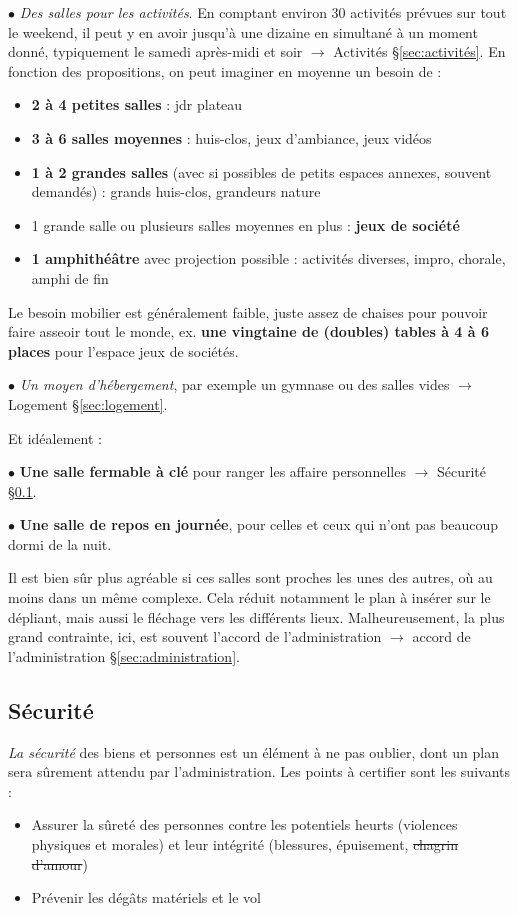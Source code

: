 $\bullet$ \emph{Des salles pour les activités}. En comptant environ 30 activités prévues sur tout le weekend, il peut y en avoir jusqu'à une dizaine en simultané à un moment donné, typiquement le samedi après-midi et soir $\to$ Activités \S\ref{sec:activités}. En fonction des propositions, on peut imaginer en moyenne un besoin de :
\begin{itemize}
    \item \textbf{2 à 4 petites salles} : jdr plateau
    \item \textbf{3 à 6 salles moyennes} : huis-clos, jeux d'ambiance, jeux vidéos
    \item \textbf{1 à 2 grandes salles} (avec si possibles de petits espaces annexes, souvent demandés) : grands huis-clos, grandeurs nature
    \item 1 grande salle ou plusieurs salles moyennes en plus : \textbf{jeux de société}
    \item \textbf{1 amphithéâtre} avec projection possible : activités diverses, impro, chorale, amphi de fin
\end{itemize}
Le besoin mobilier est généralement faible, juste assez de chaises pour pouvoir faire asseoir tout le monde, ex. \textbf{une vingtaine de (doubles) tables à 4 à 6 places} pour l'espace jeux de sociétés.

$\bullet$ \emph{Un moyen d'hébergement}, par exemple un gymnase ou des salles vides $\to$ Logement \S\ref{sec:logement}.

Et idéalement :

$\bullet$ \textbf{Une salle fermable à clé} pour ranger les affaire personnelles $\to$ Sécurité \S\ref{sec:sécurité}.

$\bullet$ \textbf{Une salle de repos en journée}, pour celles et ceux qui n'ont pas beaucoup dormi de la nuit.

Il est bien sûr plus agréable si ces salles sont proches les unes des autres, où au moins dans un même complexe. Cela réduit notamment le plan à insérer sur le dépliant, mais aussi le fléchage vers les différents lieux. Malheureusement, la plus grand contrainte, ici, est souvent l'accord de l'administration $\to$ accord de l'administration \S\ref{sec:administration}.

\subsection{Sécurité}\label{sec:sécurité}

\emph{La sécurité} des biens et personnes est un élément à ne pas oublier, dont un plan sera sûrement attendu par l'administration. Les points à certifier sont les suivants :
\begin{itemize}
    \item Assurer la sûreté des personnes contre les potentiels heurts (violences physiques et morales) et leur intégrité (blessures, épuisement, \sout{chagrin d'amour})
    \item Prévenir les dégâts matériels et le vol
\end{itemize}

